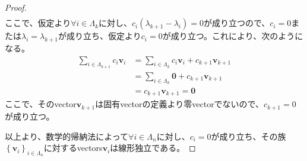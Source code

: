 \documentclass[dvipdfmx]{jsarticle}
\begin{document}
\begin{proof}
\begin{align*}
\end{align*}
ここで、仮定より$\forall i \in \varLambda_{k}$に対し、$c_{i}\left( \lambda_{k + 1} - \lambda_{i} \right) = 0$が成り立つので、$c_{i} = 0$または$\lambda_{i} = \lambda_{k + 1}$が成り立ち、仮定より$c_{i} = 0$が成り立つ。これにより、次のようになる。
\begin{align*}
\sum_{i \in \varLambda_{k + 1}} {c_{i}\mathbf{v}_{i}} &= \sum_{i \in \varLambda_{k}} {c_{i}\mathbf{v}_{i}} + c_{k + 1}\mathbf{v}_{k + 1}\\
&= \sum_{i \in \varLambda_{k}} \mathbf{0} + c_{k + 1}\mathbf{v}_{k + 1}\\
&= c_{k + 1}\mathbf{v}_{k + 1} = \mathbf{0}
\end{align*}
ここで、そのvector$\mathbf{v}_{k + 1}$は固有vectorの定義より零vectorでないので、$c_{k + 1} = 0$が成り立つ。\par
以上より、数学的帰納法によって$\forall i \in \varLambda_{n}$に対し、$c_{i} = 0$が成り立ち、その族$\left\{ \mathbf{v}_i \right\}_{i \in \varLambda_{n} } $に対するvectors$\mathbf{v}_{i}$は線形独立である。
\end{proof}
\end{document}
